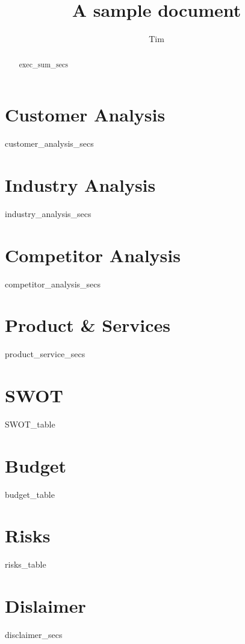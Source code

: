 \documentclass[11pt]{article}
\title{A sample document}
\author{Tim}
\begin{document}
\maketitle
\date

\newpage
\renewcommand{\abstractname}{Executive Summary}

\begin{abstract}
{{ exec_sum_secs }}
\end{abstract}

\newpage
\tableofcontents

\newpage{}
\section{Customer Analysis}
{{ customer_analysis_secs }}

\newpage{}
\section{Industry Analysis}
{{ industry_analysis_secs }}

\newpage{}
\section{Competitor Analysis}
{{ competitor_analysis_secs }}

\newpage{}
\section{Product \& Services}
{{ product_service_secs }}

\newpage{}
\section{SWOT}
{{ SWOT_table }}

\newpage{}
\section{Budget}
{{ budget_table }}

\newpage{}
\section{Risks}
{{ risks_table }}

\newpage{}
\section{Dislaimer}
{{ disclaimer_secs }}
\end{document}

